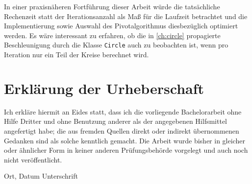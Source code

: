 \documentclass[11pt,a4paper,twoside,ngerman,openany,bibliography=totoc]{scrbook}
\theoremstyle{plain}
\theoremstyle{definition}
\begin{document}
In einer praxisnäheren Fortführung dieser Arbeit würde die tatsächliche Rechenzeit statt der Iterationsanzahl als Maß für die Laufzeit betrachtet und die Implementierung sowie Auswahl des Pivotalgorithmus diesbezüglich optimiert werden. Es wäre interessant zu erfahren, ob die in \cref{ch:circle} propagierte Beschleunigung durch die Klasse \lstinline|Circle| auch zu beobachten ist, wenn pro Iteration nur ein Teil der Kreise berechnet wird.

\backmatter
\printbibliography[title=Literaturverzeichnis]

\chapter*{Erklärung der Urheberschaft}

Ich erkläre hiermit an Eides statt, dass ich die vorliegende Bachelorarbeit ohne Hilfe Dritter und ohne Benutzung anderer als der angegebenen Hilfsmittel angefertigt habe; die aus fremden Quellen direkt oder indirekt übernommenen Gedanken sind als solche kenntlich gemacht. Die Arbeit wurde bisher in gleicher oder ähnlicher Form in keiner anderen Prüfungsbehörde vorgelegt und auch noch nicht veröffentlicht.

\vspace{3cm}
\hspace{2cm} Ort, Datum \hfill Unterschrift \hspace{2cm}
\clearpage
\end{document}
